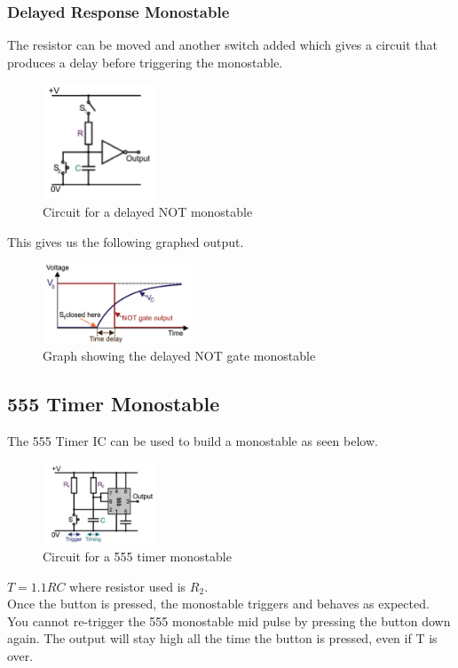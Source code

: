\documentclass[a4paper,11pt, twocolumn]{article}
\begin{document}
\subsubsection{Delayed Response Monostable}
The resistor can be moved and another switch added which gives a circuit that produces a delay before triggering the monostable.
\begin{figure}[H]
    \centering
    \includegraphics[width=0.3\textwidth]{images/monoNot2.jpg}
    \caption{Circuit for a delayed NOT monostable}
    \label{fig:monoNot2}
\end{figure}
\noindent This gives us the following graphed output.
\begin{figure}[H]
    \centering
    \includegraphics[width=0.4\textwidth]{images/monoNotGraph2.jpg}
    \caption{Graph showing the delayed NOT gate monostable}
    \label{fig:monoNotGraph2}
\end{figure}
\subsection{555 Timer Monostable}
The 555 Timer IC can be used to build a monostable as seen below.
\begin{figure}[H]
    \centering
    \includegraphics[width=0.3\textwidth]{images/mono555.jpg}
    \caption{Circuit for a 555 timer monostable}
    \label{fig:mono555}
\end{figure}
\noindent $T=1.1RC$ where resistor used is $R_2$.\\
Once the button is pressed, the monostable triggers and behaves as expected. You cannot re-trigger the 555 monostable mid pulse by pressing the button down again. The output will stay high all the time the button is pressed, even if T is over.
\end{document}
